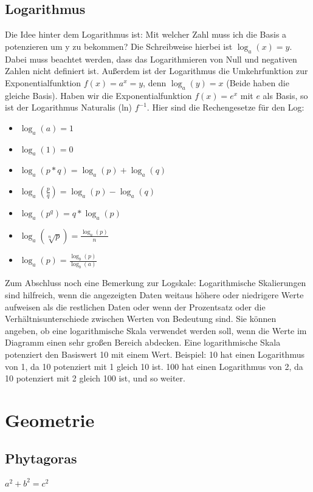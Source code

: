 \documentclass[letterpaper, titlepage]{article}
\begin{document}
\subsection{Logarithmus}\label{Logarithmus}
Die Idee hinter dem Logarithmus ist: Mit welcher Zahl muss ich die Basis a potenzieren um y zu bekommen? Die Schreibweise hierbei ist $\log_a(x)=y$. Dabei muss beachtet werden, dass das Logarithmieren von Null und negativen Zahlen nicht definiert ist. Außerdem ist der Logarithmus die Umkehrfunktion zur Exponentialfunktion $f(x)=a^x=y$, denn $\log_a(y)=x$ (Beide haben die gleiche Basis). Haben wir die Exponentialfunktion $f(x)=e^x$ mit $e$ als Basis, so ist der Logarithmus Naturalis (ln) $f^{-1}$. Hier sind die Rechengesetze für den Log:\\
\begin{itemize}
    \item $\log_a(a)=1$
    \item $\log_a(1)=0$
    \item $\log_a(p*q)=\log_a(p)+\log_a(q)$
    \item $\log_a(\frac{p}{q})=\log_a(p)-\log_a(q)$
    \item $\log_a(p^q)=q*\log_a(p)$
    \item $\log_a(\sqrt[n]{p})=\frac{\log_a(p)}{n}$
    \item $\log_a(p)=\frac{\log_b(p)}{\log_b(a)}$
\end{itemize}
\vspace{0.6cm}
Zum Abschluss noch eine Bemerkung zur Logskale: Logarithmische Skalierungen sind hilfreich, wenn die angezeigten Daten weitaus höhere oder niedrigere Werte aufweisen als die restlichen Daten oder wenn der Prozentsatz oder die Verhältnisunterschiede zwischen Werten von Bedeutung sind. Sie können angeben, ob eine logarithmische Skala verwendet werden soll, wenn die Werte im Diagramm einen sehr großen Bereich abdecken. Eine logarithmische Skala potenziert den Basiswert 10 mit einem Wert. Beispiel: 10 hat einen Logarithmus von 1, da 10 potenziert mit 1 gleich 10 ist. 100 hat einen Logarithmus von 2, da 10 potenziert mit 2 gleich 100 ist, und so weiter.
\section{Geometrie}\label{Gemoetrie}
\subsection{Phytagoras}\label{Phytagoras}
$a^2+b^2=c^2$
\end{document}

